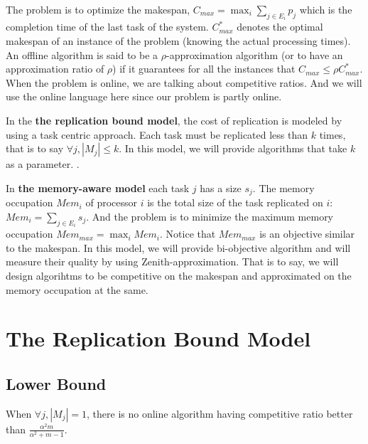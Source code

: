 \documentclass[twocolumn]{svjour3}
\begin{document}
The problem is to optimize the makespan, $C_{max} = \max_i \sum_{j \in
  E_i} p_j$ which is the completion time of the last task of the
system. $C_{max}^{*}$ denotes the optimal makespan of an instance of
the problem (knowing the actual processing times). An offline
algorithm is said to be a $\rho$-approximation algorithm (or to have
an approximation ratio of $\rho$) if it guarantees for all the
instances that $C_{max} \leq \rho C_{max}^*$. When the problem is
online, we are talking about competitive ratios. And we will use the
online language here since our problem is partly online.

In the {\bf the replication bound model}, the cost of replication is
modeled by using a task centric approach. Each task must be replicated
less than $k$ times, that is to say $\forall j, | M_j | \leq k$. In
this model, we will provide algorithms that take $k$ as a parameter. .

In {\bf the memory-aware model} each task $j$ has a size $s_j$. The
memory occupation $Mem_i$ of processor $i$ is the total size of the
task replicated on $i$: $Mem_i = \sum_{j \in E_i} s_j$. And the
problem is to minimize the maximum memory occupation $Mem_{max} =
\max_i Mem_i$. Notice that $Mem_{max}$ is an objective similar to the
makespan. In this model, we will provide bi-objective algorithm and
will measure their quality by using Zenith-approximation. That is to
say, we will design algorihtms to be competitive on the makespan and
approximated on the memory occupation at the same.


\section{The Replication Bound Model}

\subsection{Lower Bound}

\begin{theorem}
\label{th:model1-lb}
When $\forall j, |M_j| = 1$, there is no online algorithm having
competitive ratio better than $\frac{\alpha^{2}m }{\alpha^{2} + m-1}$.
\end{theorem}
 
\end{document}

